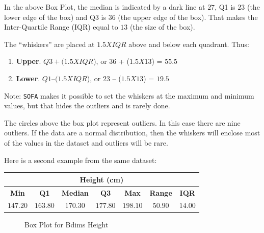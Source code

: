 In the above Box Plot, the median is indicated by a dark line at $ 27 $, Q1 is $ 23 $ (the lower edge of the box) and Q3 is $ 36 $ (the upper edge of the box). That makes the Inter-Quartile Range (IQR) equal to $ 13 $ (the size of the box). 

The ``whiskers'' are placed at $ 1.5 X IQR $ above and below each quadrant. Thus:

\begin{enumerate}
  \item \textbf{Upper}. $ Q3  + ( 1.5 X IQR $), or $ 36 $ + ($ 1.5 X 13 $) = $ 55.5 $
  \item \textbf{Lower}. $ Q1  – ( 1.5 X IQR $), or $ 23 $ – ($ 1.5 X 13 $) = $ 19.5 $
\end{enumerate}

Note: \texttt{SOFA} makes it possible to set the whiskers at the maximum and minimum values, but that hides the outliers and is rarely done.

The circles above the box plot represent outliers. In this case there are nine outliers. If the data are a normal distribution, then the whiskers will enclose most of the values in the dataset and outliers will be rare.

Here is a second example from the same dataset:

\begin{center}
  \begin{tabular}{ccccccc}
    \hline 
    \multicolumn{7}{c}{\textbf{Height (cm)}} \\ 
    \hline 
    \textbf{Min} & \textbf{Q1} & \textbf{Median} & \textbf{Q3}  & \textbf{Max} & \textbf{Range} & \textbf{IQR} \\ 
    \hline 
    $ 147.20 $ & $ 163.80 $ & $ 170.30 $ & $ 177.80 $ & $ 198.10 $ & $ 50.90 $ & $ 14.00 $ \\ 
    \hline 
  \end{tabular} 
\end{center}

\begin{figure}[H]
  \begin{center}
    \caption{Box Plot for Bdims Height}
  \end{center}
\end{figure}


